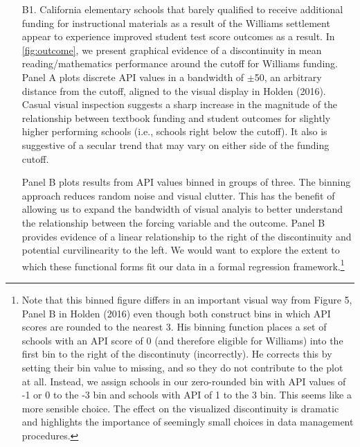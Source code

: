 \documentclass[a4paper, 11pt]{article}
\begin{document}
\begin{enumerate}
	\item[B1.] California elementary schools that barely qualified to receive additional funding for instructional materials as a result of the Williams settlement appear to experience improved student test score outcomes as a result. In \autoref{fig:outcome}, we present graphical evidence of a discontinuity in mean reading/mathematics performance around the cutoff for Williams funding. Panel A plots discrete API values in a bandwidth of $\pm$50, an arbitrary distance from the cutoff, aligned to the visual display in Holden (2016). Casual visual inspection suggests a sharp increase in the magnitude of the relationship between textbook funding and student outcomes for slightly higher performing schools (i.e., schools right below the cutoff). It also is suggestive of a secular trend that may vary on either side of the funding cutoff. 

	Panel B plots results from API values binned in groups of three. The binning approach reduces random noise and visual clutter. This has the benefit of allowing us to expand the bandwidth of visual analyis to better understand the relationship between the forcing variable and the outcome. Panel B provides evidence of a linear relationship to the right of the discontinuity and potential curvilinearity to the left. We would want to explore the extent to which these functional forms fit our data in a formal regression framework.\footnote{Note that this binned figure differs in an important visual way from Figure 5, Panel B in Holden (2016) even though both construct bins in which API scores are rounded to the nearest 3. His binning function places a set of schools with an API score of 0 (and therefore eligible for Williams) into the first bin to the right of the discontinuty (incorrectly). He corrects this by setting their bin value to missing, and so they do not contribute to the plot at all. Instead, we assign schools in our zero-rounded bin with API values of -1 or 0 to the -3 bin and schools with API of 1 to the 3 bin. This seems like a more sensible choice. The effect on the visualized discontinuity is dramatic and highlights the importance of seemingly small choices in data management procedures.}


\end{enumerate}
\end{document}
